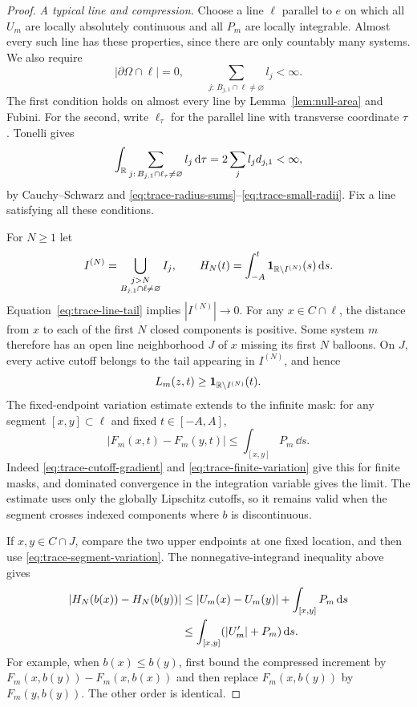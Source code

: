 \begin{proof}
\smallskip\noindent
\emph{A typical line and compression.}
Choose a line $\ell$ parallel to $e$ on which all $U_m$ are locally
absolutely continuous and all $P_m$ are locally integrable.
Almost every such line has these properties, since there are only
countably many systems.  We also require
\begin{equation}\label{eq:trace-line-tail}
 |\partial\Omega\cap\ell|=0,
 \qquad
 \sum_{j:\,B_{j,1}\cap\ell\ne\varnothing}l_j<\infty.
\end{equation}
The first condition holds on almost every line by
Lemma~\ref{lem:null-area} and Fubini.  For the second, write $\ell_\tau$
for the parallel line with transverse coordinate $\tau$.  Tonelli gives
\[
 \int_\mathbb R\sum_{j:\,B_{j,1}\cap\ell_\tau\ne\varnothing}l_j\,\mathrm d\tau
 =2\sum_jl_jd_{j,1}<\infty,
\]
by Cauchy--Schwarz and \eqref{eq:trace-radius-sums}--\eqref{eq:trace-small-radii}.
Fix a line satisfying all these conditions.

For $N\geq1$ let
\[
 I^{(N)}=\bigcup_{\substack{j>N\\B_{j,1}\cap\ell\ne\varnothing}}I_j,
 \qquad
 H_N(t)=\int_{-A}^{t}{\bf1}_{\mathbb R\setminus I^{(N)}}(s)\,\mathrm d s.
\]
Equation~\eqref{eq:trace-line-tail} implies $|I^{(N)}|\to0$.
For any $x\in C\cap\ell$, the distance from $x$ to each of the
first $N$ closed components is positive.  Some system $m$ therefore
has an open line neighborhood $J$ of $x$ missing its first $N$
balloons.  On $J$, every active cutoff belongs to the tail appearing
in $I^{(N)}$, and hence
\[
 L_m(z,t)\geq{\bf1}_{\mathbb R\setminus I^{(N)}}(t).
\]
The fixed-endpoint variation estimate extends to the infinite mask:
for any segment $[x,y]\subset\ell$ and fixed $t\in[-A,A]$,
\begin{equation}\label{eq:trace-segment-variation}
 |F_m(x,t)-F_m(y,t)|\leq\int_{[x,y]}P_m\,\dd s.
\end{equation}
Indeed \eqref{eq:trace-cutoff-gradient} and
\eqref{eq:trace-finite-variation} give this for finite masks, and
dominated convergence in the integration variable gives the limit.
The estimate uses only the globally Lipschitz cutoffs, so it remains
valid when the segment crosses indexed components where $b$ is
discontinuous.

If $x,y\in C\cap J$, compare the two upper endpoints at one fixed
location, and then use \eqref{eq:trace-segment-variation}.  The
nonnegative-integrand inequality above gives
\begin{align}
 |H_N(b(x))-H_N(b(y))|
 &\leq |U_m(x)-U_m(y)|+\int_{[x,y]}P_m\,\mathrm d s\notag\\
 &\leq\int_{[x,y]}(|U_m'|+P_m)\,\mathrm d s.
 \label{eq:trace-compression-bound}
\end{align}
For example, when $b(x)\leq b(y)$, first bound the compressed
increment by $F_m(x,b(y))-F_m(x,b(x))$ and then replace
$F_m(x,b(y))$ by $F_m(y,b(y))$.  The other order is identical.


\end{proof}
